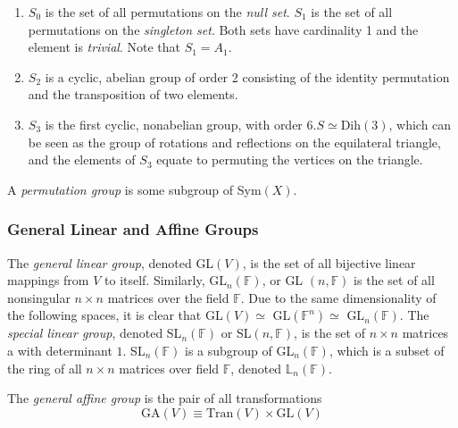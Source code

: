 \documentclass{article}
\begin{document}
      \begin{example}
      \begin{enumerate}
        \item $S_{0}$ is the set of all permutations on the \textit{null set}. $S_{1}$ is the set of all permutations on the \textit{singleton set}. Both sets have cardinality 1 and the element is \textit{trivial}. Note that $S_{1} = A_{1}$. 
        \item $S_{2}$ is a cyclic, abelian group of order 2 consisting of the identity permutation and the transposition of two elements. 
        \item $S_{3}$ is the first cyclic, nonabelian group, with order 6.$S \simeq \text{Dih}(3)$, which can be seen as the group of rotations and reflections on the equilateral triangle, and the elements of $S_{3}$ equate to permuting the vertices on the triangle. 
      \end{enumerate}
      \end{example}

      \begin{definition}
        A \textit{permutation group} is some subgroup of Sym$(X)$. 
      \end{definition}

    \subsubsection{General Linear and Affine Groups}

      \begin{definition}
        The \textit{general linear group}, denoted GL$(V)$, is the set of all bijective linear mappings from $V$ to itself. Similarly, GL$_{n}(\mathbb{F})$, or GL $(n, \mathbb{F})$ is the set of all nonsingular $n \times n$ matrices over the field $\mathbb{F}$. Due to the same dimensionality of the following spaces, it is clear that GL$(V) \simeq$ GL$(\mathbb{F}^{n}) \simeq$ GL$_{n}(\mathbb{F})$. The \textit{special linear group}, denoted SL$_{n} (\mathbb{F})$ or SL$(n, \mathbb{F})$, is the set of $n\times n$ matrices a with determinant $1$. SL$_{n}(\mathbb{F})$ is a subgroup of GL$_{n}(\mathbb{F})$, which is a subset of the ring of all $n \times n$ matrices over field $\mathbb{F}$, denoted $\mathbb{L}_{n}(\mathbb{F})$. 
      \end{definition}

      \begin{definition}
        The \textit{general affine group} is the pair of all transformations
        \begin{equation}
          \text{GA} (V) \equiv \text{Tran}(V) \times \text{GL}(V)
        \end{equation}
      \end{definition}
\end{document}
